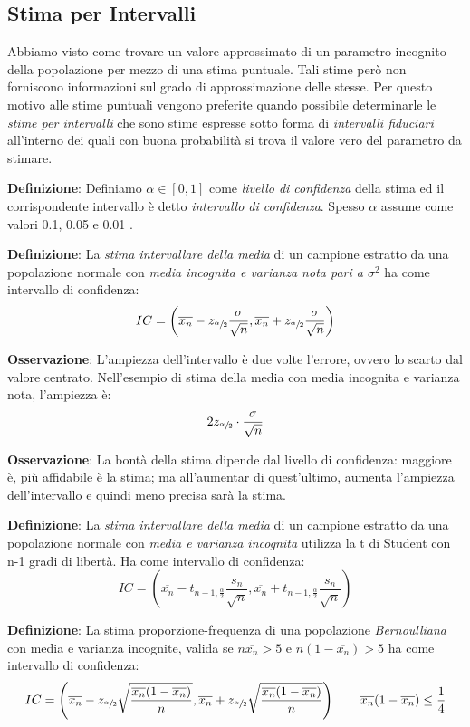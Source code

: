 \subsection{Stima per Intervalli}

Abbiamo visto come trovare un valore approssimato di un parametro incognito della popolazione per mezzo di una stima puntuale. Tali stime però non forniscono informazioni sul grado di approssimazione delle stesse. Per questo motivo alle stime puntuali vengono preferite quando possibile determinarle le \textit{stime per intervalli} che sono stime espresse sotto forma di \textit{intervalli fiduciari} all’interno dei quali con buona probabilità si trova il valore vero del parametro da stimare. \n

\ind \textbf{Definizione}: Definiamo $\alpha \in [0,1]$ come \textit{livello di confidenza} della stima ed il corrispondente intervallo è detto \textit{intervallo di confidenza}. Spesso $\alpha$ assume come valori 0.1, 0.05 e 0.01 . \n


\ind \textbf{Definizione}: La \textit{stima intervallare della media} di un campione estratto da una popolazione normale con \textit{media incognita e varianza nota pari a $\sigma^2$} ha come intervallo di confidenza: $$IC =  \left( \overline{x_n} - z_{\sfrac{\alpha}{2}} \dfrac{\sigma}{\sqrt{n}}, \overline{x_n} + z_{\sfrac{\alpha}{2}} \dfrac{\sigma}{\sqrt{n}} \right) $$

\ind \textbf{Osservazione}: L'ampiezza dell'intervallo è due volte l'errore, ovvero lo scarto dal valore centrato. Nell'esempio di stima della media con media incognita e varianza nota, l'ampiezza è: $$2 z_{\sfrac{\alpha}{2}} \cdot \frac{\sigma}{\sqrt{n}}$$


\ind \textbf{Osservazione}: La bontà della stima dipende dal livello di confidenza: maggiore è, più affidabile è la stima; ma all'aumentar di quest'ultimo, aumenta l'ampiezza dell'intervallo e quindi meno precisa sarà la stima. \n

\ind \textbf{Definizione}: La \textit{stima intervallare della media} di un campione estratto da una popolazione normale con \textit{media e varianza incognita} utilizza la t di Student con n-1 gradi di libertà. Ha come intervallo di confidenza: $$IC =  \left( \overline{x_n} - t_{n-1,\frac{\alpha}{2}} \dfrac{s_n}{\sqrt{n}}, \overline{x_n} + t_{n-1,\frac{\alpha}{2}} \dfrac{s_n}{\sqrt{n}}\right) $$

\ind \textbf{Definizione}: La stima proporzione-frequenza di una popolazione \textit{Bernoulliana} con media e varianza incognite, valida se $n\overline{x_n} > 5$ e $n(1 - \overline{x_n}) >5$ ha come intervallo di confidenza: $$IC = \left(\overline{x_n} - z_{\sfrac{\alpha}{2}} \sqrt{\dfrac{\overline{x_n}(1 -\overline{x_n})}{n}}, \overline{x_n} + z_{\sfrac{\alpha}{2}} \sqrt{\dfrac{\overline{x_n}(1 -\overline{x_n})}{n}} \right) \qquad \overline{x_n}(1 -\overline{x_n}) \leq \dfrac{1}{4}$$

